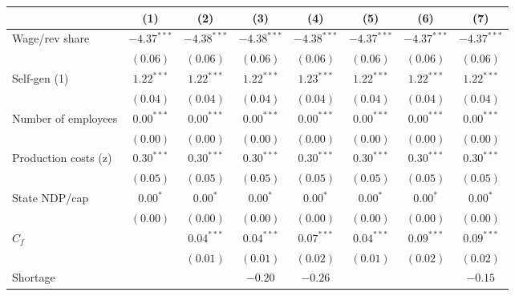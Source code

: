 
\begin{tabular}{l c c c c c c c }
\toprule
 & (1) & (2) & (3) & (4) & (5) & (6) & (7) \\
\midrule
Wage/rev share                   & $-4.37^{***}$ & $-4.38^{***}$ & $-4.38^{***}$ & $-4.38^{***}$ & $-4.37^{***}$ & $-4.37^{***}$ & $-4.37^{***}$ \\
                                 & $(0.06)$      & $(0.06)$      & $(0.06)$      & $(0.06)$      & $(0.06)$      & $(0.06)$      & $(0.06)$      \\
Self-gen (1)                     & $1.22^{***}$  & $1.22^{***}$  & $1.22^{***}$  & $1.23^{***}$  & $1.22^{***}$  & $1.22^{***}$  & $1.22^{***}$  \\
                                 & $(0.04)$      & $(0.04)$      & $(0.04)$      & $(0.04)$      & $(0.04)$      & $(0.04)$      & $(0.04)$      \\
Number of employees              & $0.00^{***}$  & $0.00^{***}$  & $0.00^{***}$  & $0.00^{***}$  & $0.00^{***}$  & $0.00^{***}$  & $0.00^{***}$  \\
                                 & $(0.00)$      & $(0.00)$      & $(0.00)$      & $(0.00)$      & $(0.00)$      & $(0.00)$      & $(0.00)$      \\
Production costs (z)             & $0.30^{***}$  & $0.30^{***}$  & $0.30^{***}$  & $0.30^{***}$  & $0.30^{***}$  & $0.30^{***}$  & $0.30^{***}$  \\
                                 & $(0.05)$      & $(0.05)$      & $(0.05)$      & $(0.05)$      & $(0.05)$      & $(0.05)$      & $(0.05)$      \\
State NDP/cap                    & $0.00^{*}$    & $0.00^{*}$    & $0.00^{*}$    & $0.00^{*}$    & $0.00^{*}$    & $0.00^{*}$    & $0.00^{*}$    \\
                                 & $(0.00)$      & $(0.00)$      & $(0.00)$      & $(0.00)$      & $(0.00)$      & $(0.00)$      & $(0.00)$      \\
$C_{f}$                          &               & $0.04^{***}$  & $0.04^{***}$  & $0.07^{***}$  & $0.04^{***}$  & $0.09^{***}$  & $0.09^{***}$  \\
                                 &               & $(0.01)$      & $(0.01)$      & $(0.02)$      & $(0.01)$      & $(0.02)$      & $(0.02)$      \\
Shortage                         &               &               & $-0.20$       & $-0.26$       &               &               & $-0.15$       \\

\end{tabular}
